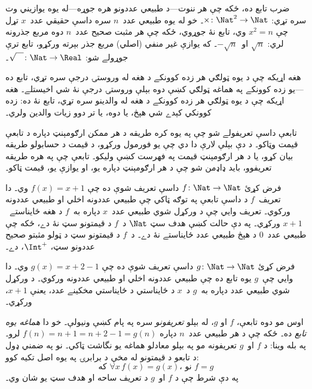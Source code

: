 \documentclass[../../../include/open-logic-section]{subfiles}
\begin{document}
\begin{ex}
ضرب تابع ده، ځکه چې هر ننوت---د طبيعي عددونو هره جوړه---له يوه
يوازيني وت سره تړي: $\times \colon \Nat^2 \to \Nat$۔ خو له يوه
طبيعي عدد~$n$ سره داسې حقيقي عدد~$x$ تړل چې $x^2 = n$ وي،
تابع نۀ جوړوي، ځکه چې هر مثبت صحيح عدد~$n$ دوه مربع جذرونه لري:
$\sqrt{n}$ او~$-\sqrt{n}$۔ که يوازې غير منفي (اصلي) مربع جذر بېرته ورکړو،
تابع ترې جوړولے شو: $\sqrt{\phantom{X}} \colon \Nat \to \Real$۔
\end{ex}

\begin{ex}
هغه اړيکه چې د يوه ټولګي هر زده کوونکے د هغه له وروستۍ درجې سره
تړي، تابع ده---يو زده کوونکے په هماغه ټولګي کښې دوه بېلې وروستۍ
درجې نۀ شي اخيستلے۔ هغه اړيکه چې د يوه ټولګي هر زده کوونکے
د هغه له والدينو سره تړي، تابع نۀ ده: زده کوونکي کېدے شي هېڅ،
يا دوه، يا تر دوو زيات والدين ولري۔
\end{ex}

\begin{explain}
تابعې داسې تعريفولے شو چې په يوه کره طريقه د هر ممکن ارګومېنټ
دپاره د تابعې قيمت وټاکو۔ د دې بېلې لارې دا دي چې يو فورمول
ورکړو، د قيمت د حسابولو طريقه بيان کړو، يا د هر ارګومېنټ قيمت
په فهرست کښې وليکو۔ تابعې چې په هره طريقه تعريفوو، بايد ډاډمن
شو چې د هر ارګومېنټ دپاره يو، او يوازې يو، قيمت ټاکو۔
\end{explain}


\begin{ex}
فرض کړئ $f \colon \Nat \to \Nat$ داسې تعريف شوې ده چې $f(x) = x+1$
وي۔ دا تعريف~$f$ د داسې تابعې په توګه ټاکي چې طبيعي عددونه اخلي
او طبيعي عددونه ورکوي۔ تعريف وايي چې د ورکړل شوي طبيعي عدد~$x$
دپاره به~$f$ د هغه ځايناستے~$x+1$ ورکړي۔ په دې حالت کښې هدف
سټ $\Nat$ د~$f$ د قيمتونو سټ نۀ دے، ځکه چې طبيعي عدد~$0$ د
هېڅ طبيعي عدد ځايناستے نۀ دے۔ د~$f$ د قيمتونو سټ د ټولو مثبتو
صحيح عددونو سټ، $\Int^{+}$، دے۔
\end{ex}

\begin{ex}
فرض کړئ $g \colon \Nat \to \Nat$ داسې تعريف شوې ده چې $g(x) = x+2-1$
وي۔ دا وايي چې~$g$ يوه تابع ده چې طبيعي عددونه اخلي او طبيعي
عددونه ورکوي۔ د ورکړل شوي طبيعي عدد دپاره به~$g$ د~$x$ د
ځايناستي د ځايناستي مخکينے عدد، يعنې $x+1$، ورکړي۔
\end{ex}

\begin{explain}
اوس مو دوه تابعې، $f$ او $g$، له بېلو \emph{تعريفونو} سره په پام
کښې ونيولې۔ خو دا \emph{هماغه يوه تابع} ده۔ ځکه چې د هر طبيعي
عدد~$n$ دپاره $f(n) = n+1 = n+2-1 = g(n)$ لرو۔ په بله وينا:
د $f$ او~$g$ تعريفونه مو په بېلو معادلو هماغه يو نگاشت ټاکي۔ نو
په ضمني ډول د تابعو د قيمتونو له مخې د برابرۍ په يوه اصل تکيه کوو:
\[
  \text{که }\forall x\, f(x) = g(x)\text{، نو }f = g
\]
په دې شرط چې د $f$ او~$g$ د تعريف ساحه او هدف سټ يو شان وي۔
\end{explain}
\end{document}
